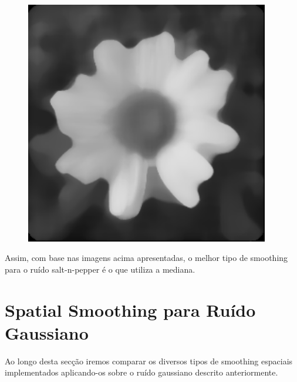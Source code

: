 \documentclass[a4paper]{report}
\begin{document}
\begin{figure}[H]
\begin{minipage}{.3\textwidth}
\end{minipage}%
\begin{minipage}{.3\textwidth}
  \centering
  \includegraphics[width=0.95\textwidth]{images/Smooth/spatial-salt-n-pepper/flower_smooth_spatial_median_20_1.png}
\end{minipage}
\end{figure}

Assim, com base nas imagens acima apresentadas, o melhor tipo de smoothing para o ruído salt-n-pepper é o que utiliza 
a mediana.

\section{Spatial Smoothing para Ruído Gaussiano}
Ao longo desta secção iremos comparar os diversos tipos de smoothing espaciais implementados aplicando-os sobre o ruído
gaussiano descrito anteriormente.
\end{document}
